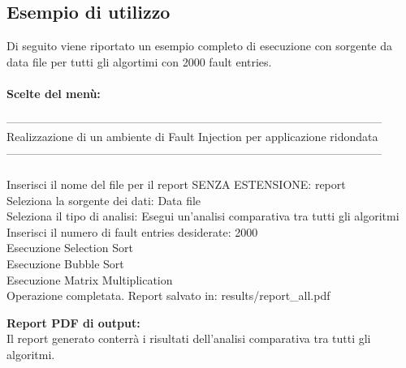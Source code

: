 \documentclass{article}
\begin{document}
\subsection{Esempio di utilizzo}
Di seguito viene riportato un esempio completo di esecuzione con sorgente da data file per tutti gli algortimi con 2000 fault entries.\\\\
\textbf{Scelte del menù:}\\
\begin{tcolorbox}[colback=black, coltext=white, sharp corners, boxrule=0.5mm, width=\textwidth]
---------------------------------------------------------------------------------------------------\\
 Realizzazione di un ambiente di Fault Injection per applicazione ridondata \\
---------------------------------------------------------------------------------------------------\\ \\
Inserisci il nome del file per il report SENZA ESTENSIONE: report\\
Seleziona la sorgente dei dati: Data file\\
Seleziona il tipo di analisi: Esegui un'analisi comparativa tra tutti gli algoritmi\\
Inserisci il numero di fault entries desiderate: 2000\\
Esecuzione Selection Sort\\
Esecuzione Bubble Sort\\
Esecuzione Matrix Multiplication\\
Operazione completata. Report salvato in: results/report\_all.pdf\\
\end{tcolorbox}
\newpage
\noindent
\textbf{Report PDF di output:}\\
Il report generato conterrà i risultati dell'analisi comparativa tra tutti gli algoritmi.
\end{document}
